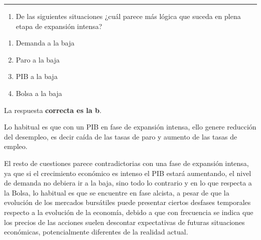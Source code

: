 \documentclass[
  letterpaper,
  DIV=11,
  numbers=noendperiod]{scrreprt}
\providecommand{\tightlist}{%
  \setlength{\itemsep}{0pt}\setlength{\parskip}{0pt}}\usepackage{longtable,booktabs,array}
\begin{document}
\begin{center}\rule{0.5\linewidth}{0.5pt}\end{center}

\begin{enumerate}
\def\labelenumi{\arabic{enumi}.}
\setcounter{enumi}{15}
\tightlist
\item
  De las siguientes situaciones ¿cuál parece más lógica que suceda en
  plena etapa de expansión intensa?
\end{enumerate}

\begin{enumerate}
\def\labelenumi{\alph{enumi})}
\item
  Demanda a la baja
\item
  Paro a la baja
\item
  PIB a la baja
\item
  Bolsa a la baja
\end{enumerate}

\begin{tcolorbox}[enhanced jigsaw, left=2mm, opacityback=0, colback=white, breakable, arc=.35mm, bottomrule=.15mm, rightrule=.15mm, toprule=.15mm, leftrule=.75mm, colframe=quarto-callout-tip-color-frame]
\begin{minipage}[t]{5.5mm}
\textcolor{quarto-callout-tip-color}{\faLightbulb}
\end{minipage}%
\begin{minipage}[t]{\textwidth - 5.5mm}

La respuesta \textbf{correcta es la b}.

Lo habitual es que con un PIB en fase de expansión intensa, ello genere
reducción del desempleo, es decir caída de las tasas de paro y aumento
de las tasas de empleo.

El resto de cuestiones parece contradictorias con una fase de expansión
intensa, ya que si el crecimiento económico es intenso el PIB estará
aumentando, el nivel de demanda no debiera ir a la baja, sino todo lo
contrario y en lo que respecta a la Bolsa, lo habitual es que se
encuentre en fase alcista, a pesar de que la evolución de los mercados
bursátiles puede presentar ciertos desfases temporales respecto a la
evolución de la economía, debido a que con frecuencia se indica que los
precios de las acciones suelen descontar expectativas de futuras
situaciones económicas, potencialmente diferentes de la realidad actual.

\end{minipage}%
\end{tcolorbox}
\end{document}
